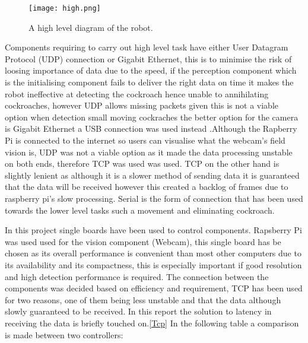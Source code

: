 \documentclass[11pt]{article}
\begin{document}
	
	\begin{center}
		
		
		\begin{figure}[H]
			\centering
			\texttt{[image: high.png]}
			\caption{A high level diagram of the robot. }
			\label{fig:robot}
		\end{figure}
	\end{center}



	
	Components requiring to carry out high level task have either User Datagram Protocol (UDP) connection or Gigabit Ethernet, this is to minimise the risk of loosing importance of data due to the speed, if the perception component which is the initialising component  fails to deliver the right data on time it makes the robot ineffective at detecting the cockroach hence unable to annihilating cockroaches, however UDP allows missing packets given this is not a viable option when detection small moving cockraches the better option for the camera is Gigabit Ethernet a USB connection was used instead .Although the Rapberry Pi is connected to the internet so users can visualise what the webcam's field vision is, UDP was not a viable option as it made the data processing unstable on both ends, therefore TCP was used was used. TCP on the other hand is slightly lenient as although it is a slower method of sending data it is guaranteed that the data will be received however this created a backlog of frames due to raspberry pi's slow processing. Serial is the form of connection that has been used towards the lower level tasks such a movement and eliminating cockroach.
	
	
	
	In this project single boards have been used to control components. Rapsberry Pi was used used for the vision component (Webcam), this single board has be chosen as its overall performance is convenient than most other computers due to its availability and its compactness, this is especially important if good resolution and high detection performance is required. The connection between the components was decided based on efficiency and requirement, TCP has been used for two reasons, one of them being less unstable and that the data although slowly guaranteed to be received. In this report the solution to latency in receiving the data is briefly touched on.\ref{Tcp} In the following table a comparison is made between two controllers:
\end{document}
